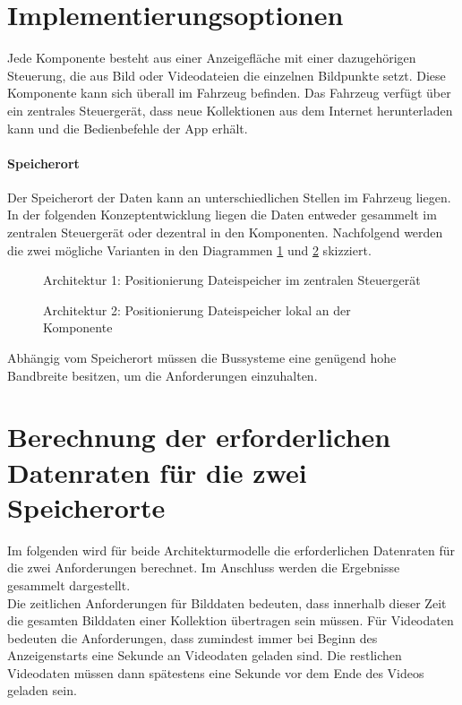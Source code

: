 \section{Implementierungsoptionen}
Jede Komponente besteht aus einer Anzeigefläche mit einer dazugehörigen Steuerung, die aus Bild oder Videodateien die einzelnen Bildpunkte setzt. Diese Komponente kann sich überall im Fahrzeug befinden.
Das Fahrzeug verfügt über ein zentrales Steuergerät, dass neue Kollektionen aus dem Internet herunterladen kann und die Bedienbefehle der App erhält.
\paragraph{Speicherort}
Der Speicherort der Daten kann an unterschiedlichen Stellen im Fahrzeug liegen. In der folgenden Konzeptentwicklung liegen die Daten entweder gesammelt im zentralen Steuergerät oder dezentral in den Komponenten. 
Nachfolgend werden die zwei mögliche Varianten in den Diagrammen \ref{fig:architektur1} und \ref{fig:architektur2} skizziert.
\begin{figure}[]
	\centering
	
	\caption[Architektur 1: Positionierung Dateispeicher im zentralen Steuergerät]{Architektur 1: Positionierung Dateispeicher im zentralen Steuergerät}
	\label{fig:architektur1}
\end{figure}
\begin{figure}[]
	\centering
	
	\caption[Architektur 2: Positionierung Dateispeicher lokal an der Komponente]{Architektur 2: Positionierung Dateispeicher lokal an der Komponente}
	\label{fig:architektur2}
\end{figure}
Abhängig vom Speicherort müssen die Bussysteme eine genügend hohe Bandbreite besitzen, um die Anforderungen einzuhalten. 
\section{Berechnung der erforderlichen Datenraten für die zwei Speicherorte}
Im folgenden wird für beide Architekturmodelle die erforderlichen Datenraten für die zwei Anforderungen berechnet. Im Anschluss werden die Ergebnisse gesammelt dargestellt. \\
Die zeitlichen Anforderungen für Bilddaten bedeuten, dass innerhalb dieser Zeit die gesamten Bilddaten einer Kollektion übertragen sein müssen. 
Für Videodaten bedeuten die Anforderungen, dass zumindest immer bei Beginn des Anzeigenstarts eine Sekunde an Videodaten geladen sind. Die restlichen Videodaten müssen dann spätestens eine Sekunde vor dem Ende des Videos geladen sein. 
